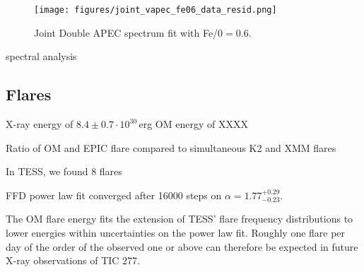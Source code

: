 \documentclass[twocolumn]{aastex631}
\begin{document}


\begin{figure}
    \begin{centering}
        \texttt{[image: figures/joint\_vapec\_fe06\_data\_resid.png]}
        \caption{
         Joint Double APEC spectrum fit with Fe/0$=0.6$.
        }
        \label{fig:spec_joint_all}
    \end{centering}
\end{figure}



spectral analysis



\subsection{Flares}

X-ray energy of $8.4\pm0.7\cdot10^{30}\,$erg
OM energy of XXXX

Ratio of OM and EPIC flare compared to \citet{guarcello2019simultaneous} simultaneous K2 and XMM flares

In TESS, we found 8 flares

FFD power law fit converged after 16000 steps on $\alpha = 1.77_{-0.23}^{+0.29}$.

The OM flare energy fits the extension of TESS' flare frequency distributions to lower energies within uncertainties on the power law fit. Roughly one flare per day of the order of the observed one or above can therefore be expected in future X-ray observations of TIC 277.
\end{document}
